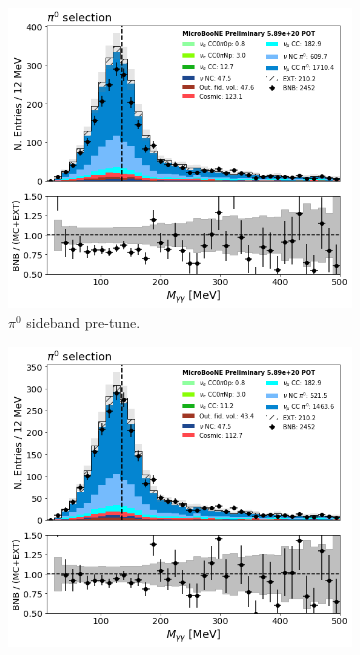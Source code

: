 

\begin{figure}[H] 
\begin{center}
    \begin{subfigure}[b]{0.45\textwidth}
    \centering
    \includegraphics[width=1.00\textwidth]{pi0/pi0tune/mass_noscaling.png}
    \caption{\label{fig:pi0tune00} $\pi^0$ sideband pre-tune.}
    \end{subfigure}
    \begin{subfigure}[b]{0.45\textwidth}
    \centering
    \includegraphics[width=1.00\textwidth]{pi0/pi0tune/mass_energycaling.png}

\end{subfigure}
\end{center}
\end{figure}
